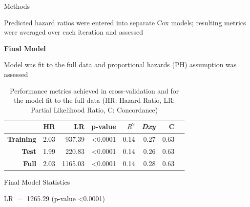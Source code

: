 \documentclass[final]{beamer}
\newlength{\onecolwid}
\begin{document}
\begin{frame}[t]
\begin{columns}[t]
\begin{column}{\onecolwid}
\begin{block}{Methods}
\vspace{0.25ex}

Predicted hazard ratios were entered into separate Cox models; resulting metrics were averaged over each iteration and assessed

\vspace{0.25ex}

\textcolor{dblue!70}{} \textcolor{dblue!70}{\textbf{Final Model}} 

\vspace{0.25ex}

Model was fit to the full data and proportional hazards (PH) assumption was assessed

\vspace{2ex}

\end{block}


% 

\begin{table}[!htbp]
\captionsetup{skip=40pt}
\vspace{2.5ex}
\begin{tabular}{|r|r|r|r|r|r|r|r|}
  \hline
  & \textbf{HR} & \textbf{LR} & \textbf{p-value} & \textbf{$R^2$} & \textbf{\textit{Dxy}} & \textbf{C} \\
  \hline
  \textbf{Training} & 2.03 & 937.39  & \textless0.0001 & 0.14 & 0.27 & 0.63 \\
  \textbf{Test}     & 1.99 & 220.83  & \textless0.0001 & 0.14 & 0.26 & 0.63 \\
  \textbf{Full}     & 2.03 & 1165.03 & \textless0.0001 & 0.14 & 0.28 & 0.63 \\
  \hline
\end{tabular}
\caption{Performance metrics achieved in cross-validation and for the model fit to the full data (HR: Hazard Ratio, LR: Partial Likelihood Ratio, C: Concordance)}
\label{table:1}
\end{table}

\vspace{2.5ex}


\begin{block}{Final Model Statistics}

\textcolor{dblue!70}{} LR $=$ 1265.29 (p-value \textless0.0001)


\end{block}
\end{column}
\end{columns}
\end{frame}
\end{document}
